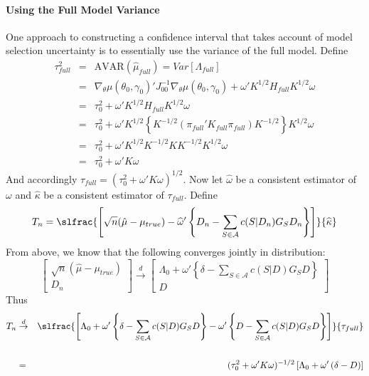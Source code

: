 \paragraph{Using the Full Model Variance} One approach to constructing a confidence interval that takes account of model selection uncertainty is to essentially use the variance of the full model. Define
	\begin{eqnarray*}
		\tau_{full}^2 &=& \mbox{AVAR}(\hat{\mu}_{full})= Var[\Lambda_{full}]\\
			&=&  \nabla_{\theta}\mu(\theta_0,\gamma_0)'J_{00}^{-1}\nabla_{\theta}\mu(\theta_0,\gamma_0) + \omega'K^{1/2}H_{full} K^{1/2}\omega\\
			&=& \tau_0^2 + \omega'K^{1/2}H_{full} K^{1/2}\omega\\
			&=& \tau_0^2 + \omega'K^{1/2}\left\{ K^{-1/2}(\pi_{full}' K_{full} \pi_{full})  K^{-1/2}  \right\} K^{1/2}\omega\\
			&=& \tau_0^2 + \omega'K^{1/2} K^{-1/2} K K^{-1/2} K^{1/2}\omega\\
			&=& \tau_0^2 + \omega' K \omega
\end{eqnarray*}
And accordingly $\tau_{full} = (\tau_0^2 + \omega' K \omega)^{1/2}$. Now let $\hat{\omega}$ be a consistent estimator of $\omega$ and $\widehat{\kappa}$ be a consistent estimator of $\tau_{full}$. Define
	$$T_n =\slfrac{\left[\sqrt{n}(\hat{\mu} - \mu_{true})  - \widehat{\omega}'\left\{D_n -  \sum_{S\in \mathcal{A}} c(S|D_n)G_S D_n \right\} \right]}{\widehat{\kappa}}$$
 From above, we know that the following converges jointly in distribution:
	$$
	\left[\begin{array}{c}
		\sqrt{n}(\hat{\mu} - \mu_{true})\\
		D_n
\end{array}\right] \overset{d}{\rightarrow}
		\left[\begin{array}{c}
		\Lambda_0 + \omega' \left\{ \delta - \sum_{S \in \mathcal{A}}  c(S|D)G_S D \right\}\\
		D
\end{array}\right] 	
$$
Thus
	\begin{eqnarray*}	
T_n &\overset{d}{\rightarrow}& \slfrac{\left[\Lambda_0 + \omega' \left\{ \delta - \sum_{S \in \mathcal{A}}  c(S|D)G_S D \right\}  - \omega'\left\{D -  \sum_{S\in \mathcal{A}} c(S|D)G_S D \right\} \right]}{\tau_{full}}\\ \\
		&=& (\tau_0^2 + \omega' K \omega)^{-1/2}\left[\Lambda_0 + \omega'\left( \delta - D\right)\right] 
\end{eqnarray*}

